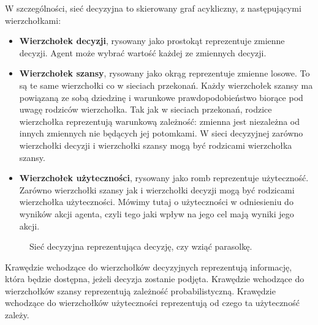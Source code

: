 \documentclass[a4paper, 12pt,oneside]{book}
\begin{document}
W szczególności, sieć decyzyjna to skierowany graf acykliczny, z następującymi
wierzchołkami:
\begin{itemize}
	\setlength\itemsep{-0.4em}
\item \textbf{Wierzchołek decyzji}, rysowany jako prostokąt reprezentuje
	zmienne decyzji. Agent może wybrać wartość każdej ze zmiennych decyzji.
\item \textbf{Wierzchołek szansy}, rysowany jako okrąg reprezentuje zmienne
	losowe. To są te same wierzchołki co w sieciach przekonań. Każdy
	wierzchołek szansy ma powiązaną ze sobą dziedzinę i warunkowe
	prawdopodobieństwo biorące pod uwagę rodziców wierzchołka. Tak jak w
	sieciach przekonań, rodzice wierzchołka reprezentują warunkową
	zależność: zmienna jest niezależna od innych zmiennych nie będących jej
	potomkami. W sieci decyzyjnej zarówno wierzchołki decyzji i wierzchołki
	szansy mogą być rodzicami wierzchołka szansy.
\item \textbf{Wierzchołek użyteczności}, rysowany jako romb reprezentuje
	użyteczność. Zarówno wierzchołki szansy jak i wierzchołki decyzji mogą
	być rodzicami wierzchołka użyteczności. Mówimy tutaj o użyteczności w
	odniesieniu do wyników akcji agenta, czyli tego jaki wpływ na jego cel
	mają wyniki jego akcji.
\end{itemize}
\begin{figure}[!htb]
\begin{center}
\caption{Sieć decyzyjna reprezentująca decyzję, czy wziąć parasolkę.}
\label{decision_network_umbrella}
\end{center}
\end{figure}
Krawędzie wchodzące do wierzchołków decyzyjnych reprezentują informację, która
będzie dostępna, jeżeli decyzja zostanie podjęta.
Krawędzie wchodzące do wierzchołków szansy reprezentują zależność
probabilistyczną.
Krawędzie wchodzące do wierzchołków użyteczności reprezentują od czego ta
użyteczność zależy.
\end{document}
